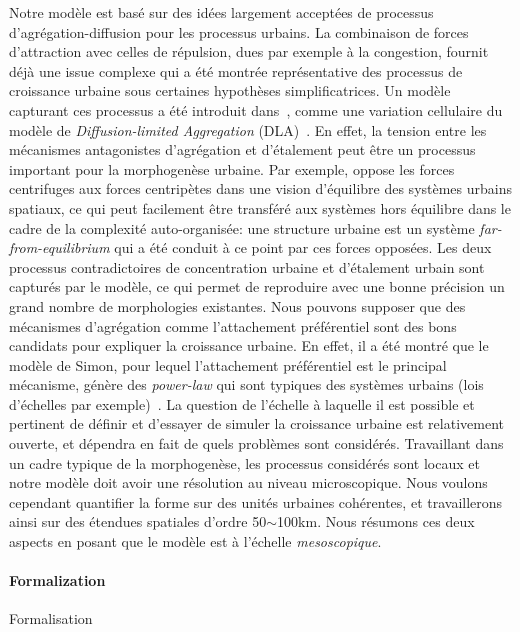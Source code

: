 {}{
Notre modèle est basé sur des idées largement acceptées de processus d'agrégation-diffusion pour les processus urbains. La combinaison de forces d'attraction avec celles de répulsion, dues par exemple à la congestion, fournit déjà une issue complexe qui a été montrée représentative des processus de croissance urbaine sous certaines hypothèses simplificatrices. Un modèle capturant ces processus a été introduit dans~\cite{batty2006hierarchy}, comme une variation cellulaire du modèle de \emph{Diffusion-limited Aggregation} (DLA)~\cite{batty1991generating}. En effet, la tension entre les mécanismes antagonistes d'agrégation et d'étalement peut être un processus important pour la morphogenèse urbaine. Par exemple, \cite{fujita1996economics} oppose les forces centrifuges aux forces centripètes  dans une vision d'équilibre des systèmes urbains spatiaux, ce qui peut facilement être transféré aux systèmes hors équilibre dans le cadre de la complexité auto-organisée: une structure urbaine est un système \emph{far-from-equilibrium} qui a été conduit à ce point par ces forces opposées. Les deux processus contradictoires de concentration urbaine et d'étalement urbain sont capturés par le modèle, ce qui permet de reproduire avec une bonne précision un grand nombre de morphologies existantes. Nous pouvons supposer que des mécanismes d'agrégation comme l'attachement préférentiel sont des bons candidats pour expliquer la croissance urbaine. En effet, il a été montré que le modèle de Simon, pour lequel l'attachement préférentiel est le principal mécanisme, génère des \emph{power-law} qui sont typiques des systèmes urbains (lois d'échelles par exemple)~\cite{2016arXiv160806313S}. La question de l'échelle à laquelle il est possible et pertinent de définir et d'essayer de simuler la croissance urbaine est relativement ouverte, et dépendra en fait de quels problèmes sont considérés. Travaillant dans un cadre typique de la morphogenèse, les processus considérés sont locaux et notre modèle doit avoir une résolution au niveau microscopique. Nous voulons cependant quantifier la forme sur des unités urbaines cohérentes, et travaillerons ainsi sur des étendues spatiales d'ordre 50$\sim$100km. Nous résumons ces deux aspects en posant que le modèle est à l'échelle \emph{mesoscopique}.
}

\paragraph{Formalization}{Formalisation}

